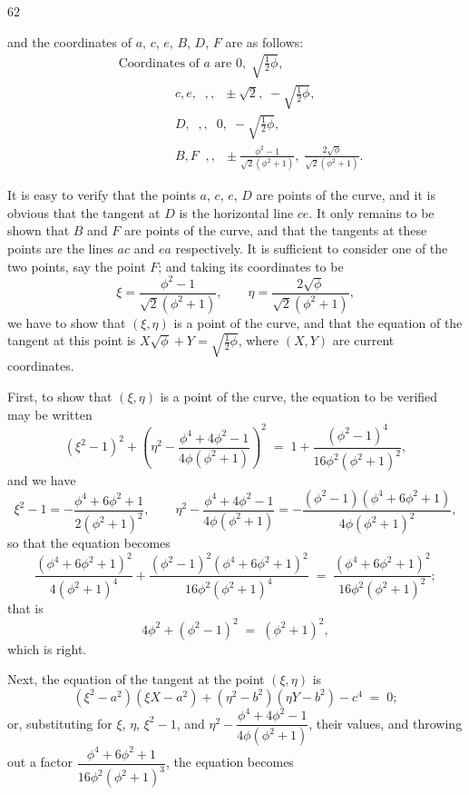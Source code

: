 \documentclass[11pt]{article}
\begin{document}
\hfill 62

\newpage

\noindent and the coordinates of $a$, $c$, $e$, $B$, $D$, $F$ are as follows:
\begin{align*}
& \text{Coordinates of } a \text{ are } 0,\; \sqrt{\tfrac{1}{2}\phi},\\
& \;\;\;\;\;\;\;\;\;\;\;\;\;\;\;\; c,e, \;\;,, \;\; \pm \sqrt{2},\; -\sqrt{\tfrac{1}{2}\phi},\\
& \;\;\;\;\;\;\;\;\;\;\;\;\;\;\;\; D,\;\;,, \;\; 0,\; -\sqrt{\tfrac{1}{2}\phi},\\
& \;\;\;\;\;\;\;\;\;\;\;\;\;\;\;\; B,F \;\;,, \;\; \pm \frac{\phi^{2} - 1}{\sqrt{2}(\phi^{2} + 1)},\; \frac{2\sqrt{\phi}}{\sqrt{2}(\phi^{2} + 1)}.
\end{align*}

It is easy to verify that the points $a$, $c$, $e$, $D$ are points of the curve, and it is obvious that the tangent at $D$ is the horizontal line $ce$. It only remains to be shown that $B$ and $F$ are points of the curve, and that the tangents at these points are the lines $ac$ and $ea$ respectively. It is sufficient to consider one of the two points, say the point $F$; and taking its coordinates to be
\[
\xi = \frac{\phi^{2} - 1}{\sqrt{2}(\phi^{2} + 1)},\qquad \eta = \frac{2\sqrt{\phi}}{\sqrt{2}(\phi^{2} + 1)},
\]
we have to show that $(\xi, \eta)$ is a point of the curve, and that the equation of the tangent at this point is $X\sqrt{\phi} + Y = \sqrt{\tfrac{1}{2}\phi}$, where $(X, Y)$ are current coordinates.

First, to show that $(\xi, \eta)$ is a point of the curve, the equation to be verified may be written
\[
(\xi^{2} - 1)^{2} + \left( \eta^{2} - \frac{\phi^{4} + 4\phi^{2} - 1}{4\phi(\phi^{2} + 1)} \right)^{2} \;=\; 1 + \frac{(\phi^{2} - 1)^{4}}{16\phi^{2}(\phi^{2} + 1)^{2}},
\]
and we have
\[
\xi^{2} - 1 = -\frac{\phi^{4} + 6\phi^{2} + 1}{2(\phi^{2} + 1)^{2}},\qquad \eta^{2} - \frac{\phi^{4} + 4\phi^{2} - 1}{4\phi(\phi^{2} + 1)} = -\frac{(\phi^{2} - 1)(\phi^{4} + 6\phi^{2} + 1)}{4\phi(\phi^{2} + 1)^{2}},
\]
so that the equation becomes
\[
\frac{(\phi^{4} + 6\phi^{2} + 1)^{2}}{4(\phi^{2} + 1)^{4}} + \frac{(\phi^{2} - 1)^{2}(\phi^{4} + 6\phi^{2} + 1)^{2}}{16\phi^{2}(\phi^{2} + 1)^{4}} \;=\; \frac{(\phi^{4} + 6\phi^{2} + 1)^{2}}{16\phi^{2}(\phi^{2} + 1)^{2}};
\]
that is
\[
4\phi^{2} + (\phi^{2} - 1)^{2} \;=\; (\phi^{2} + 1)^{2},
\]
which is right.

Next, the equation of the tangent at the point $(\xi, \eta)$ is
\[
(\xi^{2} - a^{2})(\xi X - a^{2}) + (\eta^{2} - b^{2})(\eta Y - b^{2}) - c^{4} \;=\; 0;
\]
or, substituting for $\xi$, $\eta$, $\xi^{2} - 1$, and $\eta^{2} - \dfrac{\phi^{4} + 4\phi^{2} - 1}{4\phi(\phi^{2} + 1)}$, their values, and throwing out a factor $\dfrac{\phi^{4} + 6\phi^{2} + 1}{16\phi^{2}(\phi^{2} + 1)^{3}}$, the equation becomes
\end{document}
